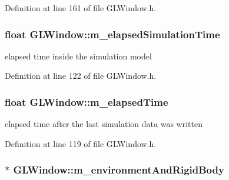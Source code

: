 Definition at line 161 of file GLWindow.h.

\hypertarget{class_g_l_window_a808ad95aba9f47b8eca08eeb98ca61f2}{
\subsubsection[{m\_\-elapsedSimulationTime}]{\setlength{\rightskip}{0pt plus 5cm}float {\bf GLWindow::m\_\-elapsedSimulationTime}}}
\label{class_g_l_window_a808ad95aba9f47b8eca08eeb98ca61f2}


elapsed time inside the simulation model 



Definition at line 122 of file GLWindow.h.

\hypertarget{class_g_l_window_aa3dfb7b4e6a13e25ebc5c9db22216b2c}{
\subsubsection[{m\_\-elapsedTime}]{\setlength{\rightskip}{0pt plus 5cm}float {\bf GLWindow::m\_\-elapsedTime}}}
\label{class_g_l_window_aa3dfb7b4e6a13e25ebc5c9db22216b2c}


elapsed time after the last simulation data was written 



Definition at line 119 of file GLWindow.h.

\hypertarget{class_g_l_window_a717436a026021c137c6b0963c0d8fc49}{
\subsubsection[{m\_\-environmentAndRigidBody}]{$\ast$ {\bf GLWindow::m\_\-environmentAndRigidBody}}}
\label{class_g_l_window_a717436a026021c137c6b0963c0d8fc49}


